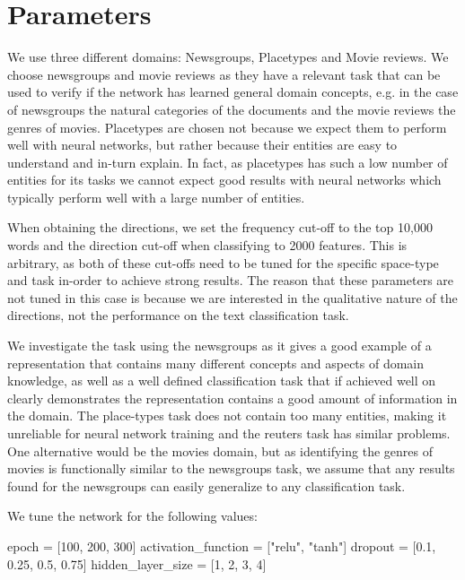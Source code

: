 


\section{Parameters}

We use three different domains: Newsgroups, Placetypes and Movie reviews. We choose newsgroups and movie reviews as they have a relevant task that can be used to verify if the network has learned general domain concepts, e.g. in the case of newsgroups the natural categories of the documents and the movie reviews the genres of movies. Placetypes are chosen not because we expect them to perform well with neural networks, but rather because their entities are easy to understand and in-turn explain. In fact, as placetypes has such a low number of entities for its tasks we cannot expect good results with neural networks which typically perform well with a large number of entities.

When obtaining the directions, we set the frequency cut-off to the top 10,000 words and the direction cut-off when classifying to 2000 features. This is arbitrary, as both of these cut-offs need to be tuned for the specific space-type and task in-order to achieve strong results. The reason that these parameters are not tuned in this case is because we are interested in the qualitative nature of the directions, not the performance on the text classification task. 

We investigate the task using the newsgroups as it gives a good example of a representation that contains many different concepts and aspects of domain knowledge, as well as a well defined classification task that if achieved well on clearly demonstrates the representation contains a good amount of information in the domain. The place-types task does not contain too many entities, making it unreliable for neural network training and the reuters task has similar problems. One alternative would be the movies domain, but as identifying the genres of movies is functionally similar to the newsgroups task, we assume that any results found for the newsgroups can easily generalize to any classification task.

We tune the network for the following values: 

epoch = [100, 200, 300]
activation_function = ["relu", "tanh"]
dropout = [0.1, 0.25, 0.5, 0.75]
hidden_layer_size = [1,  2, 3, 4]

